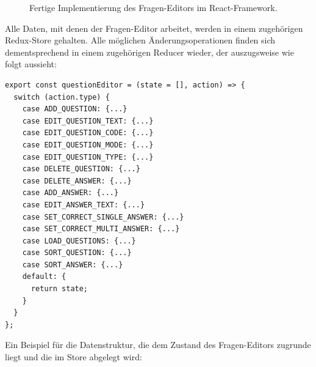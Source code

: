 \begin{figure}[H]
    \centering
    \setlength{\fboxsep}{0pt}
    \setlength{\fboxrule}{0.5pt}
    \caption[Fertiger Fragen-Editor in Weclare]{Fertige Implementierung des Fragen-Editors im React-Framework.}
    \label{abb:weclare_editor}
\end{figure}

Alle Daten, mit denen der Fragen-Editor arbeitet, werden in einem zugehörigen Redux-Store gehalten. Alle möglichen Änderungsoperationen finden sich dementsprechend in einem zugehörigen Reducer wieder, der auszugsweise wie folgt aussieht:


\begin{minipage}{\linewidth}
\begin{lstlisting}[caption={Auszug aus dem Reducer für den Fragen-Editor (aus: src/server/reducers/questions.js)}]
export const questionEditor = (state = [], action) => {
  switch (action.type) {
    case ADD_QUESTION: {...}
    case EDIT_QUESTION_TEXT: {...}
    case EDIT_QUESTION_CODE: {...}
    case EDIT_QUESTION_MODE: {...}
    case EDIT_QUESTION_TYPE: {...}
    case DELETE_QUESTION: {...}
    case DELETE_ANSWER: {...}
    case ADD_ANSWER: {...}
    case EDIT_ANSWER_TEXT: {...}
    case SET_CORRECT_SINGLE_ANSWER: {...}
    case SET_CORRECT_MULTI_ANSWER: {...}
    case LOAD_QUESTIONS: {...}
    case SORT_QUESTION: {...}
    case SORT_ANSWER: {...}
    default: {
      return state;
    }
  }
};
\end{lstlisting}
\end{minipage}


Ein Beispiel für die Datenstruktur, die dem Zustand des Fragen-Editors zugrunde liegt und die im Store abgelegt wird:

